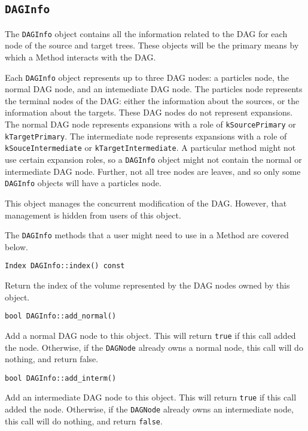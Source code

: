 \subsection{\texttt{DAGInfo}}

The \texttt{DAGInfo} object contains all the information related to the DAG
for each node of the source and target trees. These objects will be the
primary means by which a Method interacts with the DAG.

Each \texttt{DAGInfo} object represents up to three DAG nodes: a particles
node, the normal DAG node, and an intemediate DAG node. The particles node
represents the terminal nodes of the DAG: either the information about
the sources, or the information about the targets. These DAG nodes do not
represent expansions. The normal
DAG node represents expansions with a role of \texttt{kSourcePrimary} or
\texttt{kTargetPrimary}. The intermediate node represents expansions with a
role of \texttt{kSouceIntermediate} or \texttt{kTargetIntermediate}. A
particular method might not use certain expansion roles, so a
\texttt{DAGInfo} object might not contain the normal or intermediate DAG node.
Further, not all tree nodes are leaves, and so only some \texttt{DAGInfo}
objects will have a particles node.

This object manages the concurrent modification of the DAG. However, that
management is hidden from users of this object.

The \texttt{DAGInfo} methods that a user might need to use in a Method are
covered below.

\begin{lstlisting}
Index DAGInfo::index() const
\end{lstlisting}


Return the index of the volume represented by the DAG nodes owned by this
object.

\begin{lstlisting}
bool DAGInfo::add_normal()
\end{lstlisting}

Add a normal DAG node to this object. This will return \texttt{true} if this
call added the node. Otherwise, if the \texttt{DAGNode} already owns a normal
node, this call will do nothing, and return false.

\begin{lstlisting}
bool DAGInfo::add_interm()
\end{lstlisting}

Add an intermediate DAG node to this object. This will return \texttt{true} if
this call added the node. Otherwise, if the \texttt{DAGNode} already owns an
intermediate node, this call will do nothing, and return \texttt{false}.

